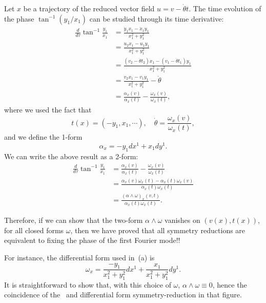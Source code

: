 \begin{description}
{Let $x$ be a trajectory of the reduced vector field $u=v-\dot{\theta}t$. The time evolution of the phase $\tan^{-1} (y_1/x_1)$ can be studied through its time derivative:
\begin{align*}
\frac{d}{d\tau}\tan^{-1}\frac{y_1}{x_1}&=\frac{\dot y_1 x_1-\dot x_1y_1}{x_1^2+y_1^2}\\
   & = \frac{u_2 x_1-u_1y_1}{x_1^2+y_1^2}\\
   & = \frac{(v_2-\dot{\theta}t_2) x_1-(v_1-\dot\theta t_1)y_1}{x_1^2+y_1^2}\\
   & =\frac{v_2x_1-v_1y_1}{x_1^2+y_1^2}-\dot\theta\\
   & = \frac{\alpha_x(v)}{\alpha_x(t)}-\frac{\omega_x(v)}{\omega_x(t)},
\end{align*}
where we used the fact that
$$t(x)=(-y_1,x_1,\cdots),\quad \dot\theta = \frac{\omega_x(v)}{\omega_x(t)},$$
and we define the 1-form
$$\alpha_x=-y_1dx^1+x_1dy^1.$$
We can write the above result as a 2-form:
\begin{align*}
\frac{d}{d\tau}\tan^{-1}\frac{y_1}{x_1}&=\frac{\alpha_x(v)}{\alpha_x(t)}-\frac{\omega_x(v)}{\omega_x(t)}\\
  & = \frac{\alpha_x(v)\omega_x(t)-\alpha_x(t)\omega_x(v)}{\alpha_x(t)\omega_x(t)}\\
  & = \frac{(\alpha\wedge\omega)_x(v,t)}{\alpha_x(t)\omega_x(t)}.
\end{align*}

Therefore, if we can show that the two-form $\alpha\wedge\omega$ vanishes on
$(v(x),t(x))$, for all closed forms $\omega$, then we have proved that all symmetry
reductions are equivalent to fixing the phase of the first Fourier mode!!

For instance, the differential form used in \,(a) is
$$\omega_x = \frac{-y_1}{x_1^2+y_1^2}dx^1+\frac{x_1}{x_1^2+y_1^2}dy^1.$$
It is straightforward to show that, with this choice of $\omega$,
$\alpha\wedge\omega\equiv 0$, hence the coincidence of
the \fFslice\ and differential form symmetry-reduction in that figure.
}

\end{description}
